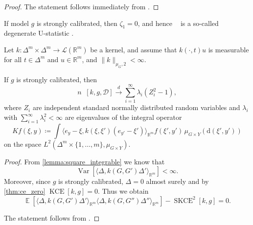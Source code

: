 \documentclass{article}
\DeclareMathOperator{\Expect}{\mathbb{E}}
\DeclareMathOperator{\Var}{Var}
\DeclareMathOperator{\kernelmeasure}{KCE}
\DeclareMathOperator{\squaredkernelmeasure}{SKCE}
\DeclareMathOperator{\unbiasedestimator}{\widehat{SKCE}_{uq}}
\begin{document}
\begin{proof}
  The statement follows immediately from \citet[Theorem~12.3][]{vaart98_asymp_statis}.
\end{proof}

If model $g$ is strongly calibrated, then $\zeta_1 = 0$, and hence
$\unbiasedestimator$ is a so-called degenerate U-statistic
\citep[see, e.g., Section~12.3][]{vaart98_asymp_statis}.

\begin{theorem}\label{thm:quadratic_asymptotic_degenerate}
  Let $k \colon \Delta^m \times \Delta^m \to \mathcal{L}(\mathbb{R}^m)$ be a
  kernel, and assume that $k(\cdot,t) u$ is measurable for all $t \in \Delta^m$ and
  $u \in \mathbb{R}^m$, and $\|k\|_{\mu_G,2} < \infty$.

  If $g$ is strongly calibrated, then
  \begin{equation*}
    n \unbiasedestimator[k, g, \mathcal{D}] \xrightarrow{d} \sum_{i=1}^\infty \lambda_i (Z_i^2 - 1),
  \end{equation*}
  where $Z_i$ are independent standard normally distributed random variables and
  $\lambda_i$ with $\sum_{i=1}^\infty \lambda_i^2 < \infty$ are eigenvalues of
  the integral operator
  \begin{equation*}
    Kf(\xi,y) \coloneqq \int \langle e_y - \xi, k(\xi, \xi') (e_{y'} - \xi') \rangle_{\mathbb{R}^m} f(\xi',y') \,\mu_{G\times Y}(\mathrm{d}(\xi',y'))
  \end{equation*}
  on the space $L^2(\Delta^m \times \{1,\ldots,m\}, \mu_{G \times Y})$.
\end{theorem}

\begin{proof}
  From \cref{lemma:square_integrable} we know that
  \begin{equation*}
    \Var[\langle \Delta, k(G,G') \Delta' \rangle_{\mathbb{R}^m}] < \infty.
  \end{equation*}
  Moreover, since $g$ is strongly calibrated, $\Delta = 0$ almost surely and by
  \cref{thm:ce_zero} $\kernelmeasure[k, g] = 0$. Thus we obtain
  \begin{equation*}
    \Expect[\langle \Delta, k(G,G') \Delta' \rangle_{\mathbb{R}^m} \langle \Delta, k(G,G'') \Delta'' \rangle_{\mathbb{R}^m}] - \squaredkernelmeasure^2[k, g] = 0.
  \end{equation*}

  The statement follows from
  \citet[Theorem in Section~5.5.2][]{serfling80_approx_theor_mathem_statis}.
\end{proof}
\end{document}
